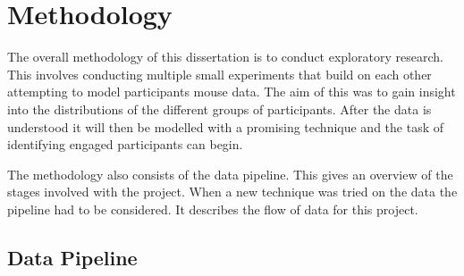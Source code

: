 \documentclass{article}
\begin{document}






\section{Methodology}

The overall methodology of this dissertation is to conduct exploratory research.
This involves conducting multiple small experiments that build on each other attempting to model participants mouse data.
The aim of this was to gain insight into the distributions of the different groups of participants.
After the data is understood it will then be modelled with a promising technique and the task of identifying engaged participants can begin. 

The methodology also consists of the data pipeline.
This gives an overview of the stages involved with the project.
When a new technique was tried on the data the pipeline had to be considered. 
It describes the flow of data for this project.





\subsection{Data Pipeline}
\end{document}
